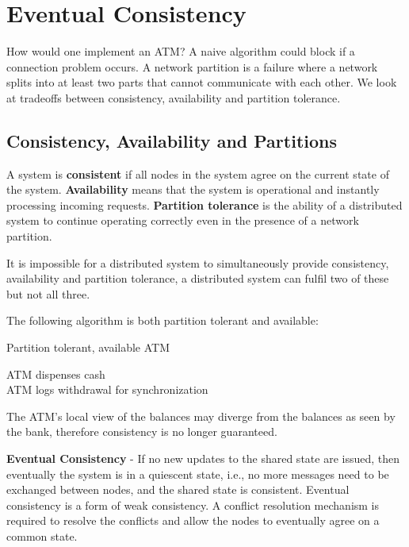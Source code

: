\section{Eventual Consistency}

How would one implement an ATM? A naive algorithm could block if a connection problem occurs. A network partition is a failure where a network splits into at least two parts that cannot communicate with each other. We look at tradeoffs between consistency, availability and partition tolerance.


\subsection{Consistency, Availability and Partitions}

A system is \textbf{consistent} if all nodes in the system agree on the current state of the system. \textbf{Availability} means that the system is operational and instantly processing incoming requests. \textbf{Partition tolerance} is the ability of a distributed system to continue operating correctly even in the presence of a network partition. \medskip

It is impossible for a distributed system to simultaneously provide consistency, availability and partition tolerance, a distributed system can fulfil two of these but not all three.\medskip

The following algorithm is both partition tolerant and available:\medskip

\begin{algorithm}[H]
\caption{Partition tolerant, available ATM}
	ATM dispenses cash \\
	ATM logs withdrawal for synchronization
\end{algorithm}
\medskip

The ATM's local view of the balances may diverge from the balances as seen by the bank, therefore consistency is no longer guaranteed. \medskip

\textbf{Eventual Consistency} - If no new updates to the shared state are issued, then eventually the system is in a quiescent state, i.e., no more messages need to be exchanged between nodes, and the shared state is consistent. Eventual consistency is a form of weak consistency. A conflict resolution mechanism is required to resolve the conflicts and allow the nodes to eventually agree on a common state.


